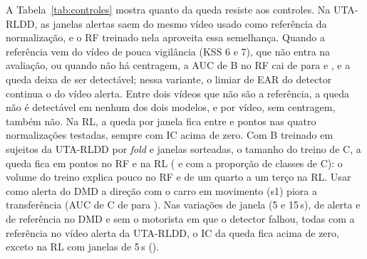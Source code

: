 \documentclass[conference]{IEEEtran}
\begin{document}
A Tabela~\ref{tab:controles} mostra quanto da queda resiste aos controles. Na UTA-RLDD, as janelas alertas saem do mesmo vídeo usado como referência da normalização, e o RF treinado nela aproveita essa semelhança. Quando a referência vem do vídeo de pouca vigilância (KSS 6 e 7), que não entra na avaliação, ou quando não há centragem, a AUC de B no RF cai de \ExpCincoBAUCJanelaB{} para \ExpCincoBRefAltAUCJanelaB{} e \ExpCincoBSemNormAUCJanelaB, e a queda deixa de ser detectável; nessa variante, o limiar de EAR do detector continua o do vídeo alerta. Entre dois vídeos que não são a referência, a queda não é detectável em nenhum dos dois modelos, e por vídeo, sem centragem, também não. Na RL, a queda por janela fica entre \ExpCincoBLRQuedaNormMin{} e \ExpCincoBLRQuedaNormMax{} pontos nas quatro normalizações testadas, sempre com IC acima de zero. Com B treinado em \BaseDMDSujeitos{} sujeitos da UTA-RLDD por \emph{fold} e \BaseDMDJanelas{} janelas sorteadas, o tamanho do treino de C, a queda fica em \ExpCincoBTrezeQuinhentasQuedaAUCJanela{} pontos no RF e \ExpCincoBLRTrezeQuinhentasQuedaAUCJanela{} na RL (\ExpCincoBTrezeProporcaoQuedaAUCJanela{} e \ExpCincoBLRTrezeProporcaoQuedaAUCJanela{} com a proporção de classes de C): o volume do treino explica pouco no RF e de um quarto a um terço na RL. Usar como alerta do DMD a direção com o carro em movimento (s1) piora a transferência (AUC de C de \ExpCincoBAUCJanelaC{} para \ExpCincoBAlertaSUmAUCJanelaC). Nas variações de janela (5 e 15\,s), de alerta e de referência no DMD e sem o motorista em que o detector falhou, todas com a referência no vídeo alerta da UTA-RLDD, o IC da queda fica acima de zero, exceto na RL com janelas de 5\,s (\ExpCincoBLRJanelaCincoQuedaAUCJanelaComIC).
\end{document}

